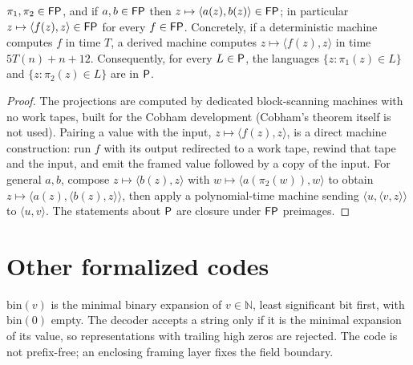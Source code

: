 \begin{theorem}
  \label{thm:encodings-pair-fp}
  \leanok
  $\pi_1, \pi_2 \in \mathsf{FP}$, and if $a, b \in \mathsf{FP}$ then
  $z \mapsto \langle a(z), b(z) \rangle \in \mathsf{FP}$; in particular
  $z \mapsto \langle f(z), z \rangle \in \mathsf{FP}$ for every $f \in \mathsf{FP}$.
  Concretely, if a deterministic machine computes $f$ in time $T$, a derived
  machine computes $z \mapsto \langle f(z), z \rangle$ in time
  $5T(n) + n + 12$. Consequently, for every $L \in \mathsf{P}$, the languages
  $\{z : \pi_1(z) \in L\}$ and $\{z : \pi_2(z) \in L\}$ are in $\mathsf{P}$.
\end{theorem}
\begin{proof}
  \leanok
  The projections are computed by dedicated block-scanning machines with no
  work tapes, built for the Cobham development (Cobham's theorem itself is not
  used). Pairing a value with the input, $z \mapsto \langle f(z), z \rangle$,
  is a direct machine construction: run $f$ with its output redirected to a
  work tape, rewind that tape and the input, and emit the framed value
  followed by a copy of the input. For general $a, b$, compose
  $z \mapsto \langle b(z), z \rangle$ with
  $w \mapsto \langle a(\pi_2(w)), w \rangle$ to obtain
  $z \mapsto \langle a(z), \langle b(z), z \rangle \rangle$, then apply a
  polynomial-time machine sending $\langle u, \langle v, z \rangle \rangle$ to
  $\langle u, v \rangle$. The statements about $\mathsf{P}$ are closure under
  $\mathsf{FP}$ preimages.
\end{proof}

\section{Other formalized codes}

\begin{definition}
  \label{def:encodings-binary-nat}
  \leanok
  $\mathrm{bin}(v)$ is the minimal binary expansion of $v \in \mathbb{N}$,
  least significant bit first, with $\mathrm{bin}(0)$ empty. The decoder
  accepts a string only if it is the minimal expansion of its value, so
  representations with trailing high zeros are rejected. The code is not
  prefix-free; an enclosing framing layer fixes the field boundary.
\end{definition}

